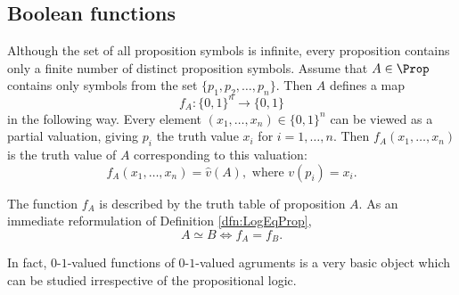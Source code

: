 \subsection{Boolean functions}
Although the set of all proposition symbols is infinite,
every proposition contains only a finite number of distinct proposition symbols.
Assume that $A \in \Prop$ contains only symbols from the set $\{p_1, p_2, \ldots, p_n\}$.
Then $A$ defines a map
\[
f_A \colon \{0,1\}^n \to \{0,1\}
\]
in the following way.
Every element $(x_1, \ldots, x_n) \in \{0,1\}^n$ can be viewed as a partial valuation, giving $p_i$ the truth value $x_i$ for $i = 1, \ldots, n$.
Then $f_A(x_1, \ldots, x_n)$ is the truth value of $A$ corresponding to this valuation:
\[
f_A(x_1, \ldots, x_n) = \hat{v}(A), \text{ where } v(p_i) = x_i.
\]

The function $f_A$ is described by the truth table of proposition $A$.
As an immediate reformulation of Definition \ref{dfn:LogEqProp},
\[
A \simeq B \Leftrightarrow f_A = f_B.
\]

In fact, $0$-$1$-valued functions of $0$-$1$-valued agruments is a very basic object which can be studied irrespective of the propositional logic.